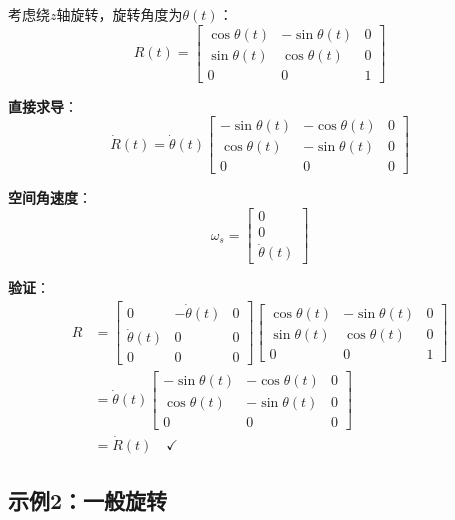 \documentclass[12pt,a4paper]{article}
\begin{document}
考虑绕$z$轴旋转，旋转角度为$\theta(t)$：
\begin{equation}
R(t) = \begin{bmatrix}
\cos\theta(t) & -\sin\theta(t) & 0 \\
\sin\theta(t) & \cos\theta(t) & 0 \\
0 & 0 & 1
\end{bmatrix}
\end{equation}

\textbf{直接求导}：
\begin{equation}
\dot{R}(t) = \dot{\theta}(t) \begin{bmatrix}
-\sin\theta(t) & -\cos\theta(t) & 0 \\
\cos\theta(t) & -\sin\theta(t) & 0 \\
0 & 0 & 0
\end{bmatrix}
\end{equation}

\textbf{空间角速度}：
\begin{equation}
\omega_s = \begin{bmatrix} 0 \\ 0 \\ \dot{\theta}(t) \end{bmatrix}
\end{equation}

\textbf{验证}：
\begin{align}
[\omega_s] R &= \begin{bmatrix}
0 & -\dot{\theta}(t) & 0 \\
\dot{\theta}(t) & 0 & 0 \\
0 & 0 & 0
\end{bmatrix} \begin{bmatrix}
\cos\theta(t) & -\sin\theta(t) & 0 \\
\sin\theta(t) & \cos\theta(t) & 0 \\
0 & 0 & 1
\end{bmatrix} \\
&= \dot{\theta}(t) \begin{bmatrix}
-\sin\theta(t) & -\cos\theta(t) & 0 \\
\cos\theta(t) & -\sin\theta(t) & 0 \\
0 & 0 & 0
\end{bmatrix} \\
&= \dot{R}(t) \quad \checkmark
\end{align}

\subsection{示例2：一般旋转}
\end{document}
